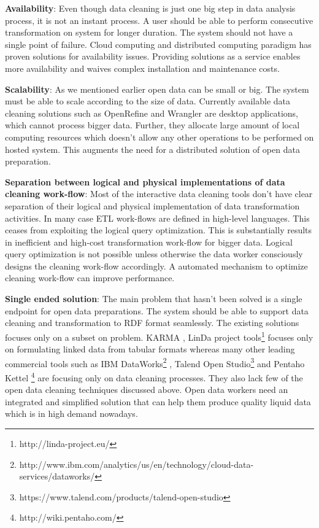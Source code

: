 \textbf{Availability}: Even though data cleaning is just one big step in data analysis process, it is not an instant process. A user should be able to perform consecutive transformation on system for longer duration. The system should not have a single point of failure\cite{mesa}. Cloud computing and distributed computing paradigm has proven solutions for availability issues. Providing solutions as a service enables more availability and waives complex installation and maintenance costs.

\textbf{Scalability}: As we mentioned earlier open data can be small or big. The system must be able to scale according to the size of data. Currently available data cleaning solutions such as OpenRefine\cite{openrefine} and Wrangler \cite{2011-wrangler} are desktop applications, which cannot process bigger data. Further, they allocate large amount of local computing resources which doesn't allow any other operations to be performed on hosted system. This augments the need for a distributed solution of open data preparation. 

\textbf{Separation between logical and physical implementations of data cleaning work-flow}: Most of the interactive data cleaning tools don't have clear separation of their logical and physical implementation of data transformation activities\cite{declarativedatacleaning}\cite{Wisteria}. In many case ETL work-flows are defined in high-level languages\cite{ETL}. This ceases from exploiting the logical query optimization. This is substantially results in inefficient and high-cost transformation work-flow for bigger data.  Logical query optimization is not possible unless otherwise the data worker consciously designs the cleaning work-flow accordingly\cite{ETL}. A automated mechanism to optimize cleaning work-flow can improve performance. 

\textbf{Single ended solution}: The main problem that hasn't been solved is a single endpoint for open data preparations. The system should be able to support data cleaning and transformation to RDF format seamlessly. The existing solutions focuses only on a subset on problem. KARMA \cite{karma}, LinDa project tools\footnote{http://linda-project.eu/} focuses only on formulating linked data from tabular formats whereas many other leading commercial tools such as IBM DataWorks\footnote{http://www.ibm.com/analytics/us/en/technology/cloud-data-services/dataworks/} , Talend Open Studio\footnote{https://www.talend.com/products/talend-open-studio} and Pentaho Kettel \footnote{http://wiki.pentaho.com/} are focusing only on data cleaning processes. They also lack few of the open data cleaning techniques discussed above. Open data workers need an integrated and simplified solution that can help them produce quality liquid data which is in high demand nowadays. 

